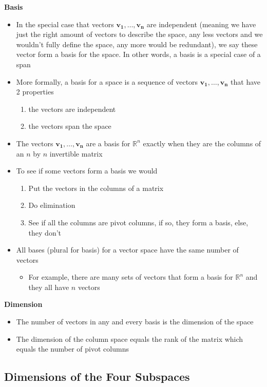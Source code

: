 \documentclass[11pt]{article}
\begin{document}
\textbf{Basis}
\begin{itemize}    
    \item In the special case that vectors $\boldsymbol{v_1}, \ldots, \boldsymbol{v_n}$ are
    independent (meaning we have just the right amount of vectors to describe the space, any 
    less vectors and we wouldn't fully define the space, any more would be redundant), we say
    these vector form a basis for the space. In other words, a basis is a special case of a 
    span
    \item More formally, a basis for a space is a sequence of vectors $\boldsymbol{v_1}, \ldots
    , \boldsymbol{v_n}$ that have 2 properties
    \begin{enumerate}
        \item the vectors are independent
        \item the vectors span the space
    \end{enumerate}
    \item The vectors $\boldsymbol{v_1}, \ldots, \boldsymbol{v_n}$ are a basis for $\mathbb{R}^n$
    exactly when they are the columns of an $n$ by $n$ invertible matrix
    \item To see if some vectors form a basis we would 
    \begin{enumerate}
        \item Put the vectors in the columns of a matrix
        \item Do elimination
        \item See if all the columns are pivot columns, if so, they form a basis, else, they 
        don't
    \end{enumerate}
    \item All bases (plural for basis) for a vector space have the same number of vectors
    \begin{itemize}
        \item For example, there are many sets of vectors that form a basis for $\mathbb{R}^n$ 
        and they all have $n$ vectors
    \end{itemize}
    
\end{itemize}

\textbf{Dimension}
\begin{itemize}
    \item The number of vectors in any and every basis is the dimension of the space
    \item The dimension of the column space equals the rank of the matrix which equals the
    number of pivot columns
\end{itemize}

\subsection{Dimensions of the Four Subspaces}
\end{document}
